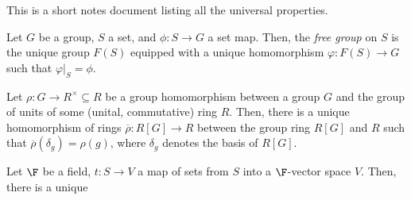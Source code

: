 \documentclass[10pt]{mypackage}
\begin{document}
\RaggedRight
This is a short notes document listing all the universal properties.
\begin{theorem}
  Let $G$ be a group, $S$ a set, and $\phi\colon S\rightarrow G$ a set map. Then, the \textit{free group} on $S$ is the unique group $F(S)$ equipped with a unique homomorphism $\varphi\colon F(S)\rightarrow G$ such that $\varphi|_{S} = \phi$.
  \begin{center}
  \end{center}
\end{theorem}
\begin{theorem}
  Let $\rho\colon G\rightarrow R^{\times}\subseteq R$ be a group homomorphism between a group $G$ and the group of units of some (unital, commutative) ring $R$. Then, there is a unique homomorphism of rings $ \overline{\rho}\colon R[G]\rightarrow R $ between the group ring $R[G]$ and $R$ such that $ \overline{\rho}\left( \delta_g \right) = \rho(g)  $, where $\delta_g$ denotes the basis of $R[G]$.
  \begin{center}
  \end{center}
\end{theorem}
\begin{theorem}
  Let $\F$ be a field, $t\colon S\rightarrow V$ a map of sets from $S$ into a $\F$-vector space $V$. Then, there is a unique 
  \begin{center}
  \end{center}
\end{theorem}
\end{document}
